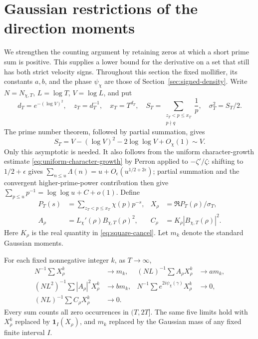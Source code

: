 \section{Gaussian restrictions of the direction moments}
\label{sec:gaussian-moments}
We strengthen the counting argument by retaining zeros at which a short
prime sum is positive. This supplies a lower bound for the derivative
on a set that still has both strict velocity signs. Throughout this
section the fixed mollifier, its constants $a,b$, and the phase
$\psi_\chi$ are those of Section~\ref{sec:signed-density}. Write
$N=N_{\chi,T}$, $L=\log T$, $V=\log L$, and put
\[
 d_T=e^{-(\log V)^2},\quad z_T=d_T^{-1},\quad x_T=T^{d_T},\quad
 S_T=\sum_{\substack{z_T<p\le x_T\\p\nmid q}}\frac1p,
 \quad \sigma_T^2=S_T/2.
\]
The prime number theorem, followed by partial summation, gives
\[
 S_T=V-(\log V)^2-2\log\log V+O_\chi(1)\sim V.
\]
Only this asymptotic is needed. It also follows from the uniform
character-growth estimate \eqref{eq:uniform-character-growth} by Perron
applied to $-\zeta'/\zeta$: shifting to $1/2+\epsilon$ gives
$\sum_{n\le u}\Lambda(n)=u+O_\epsilon(u^{1/2+2\epsilon})$;
partial summation and the convergent higher-prime-power contribution
then give $\sum_{p\le u}p^{-1}=\log\log u+C+o(1)$.
Define
\begin{align*}
 P_T(s)&=\sum_{z_T<p\le x_T}\chi(p)p^{-s},&
 X_\rho&=\Re P_T(\rho)/\sigma_T,\\
 A_\rho&=L_\chi'(\rho)B_{\chi,T}(\rho)^2,&
 C_\rho&=K_\rho|B_{\chi,T}(\rho)|^2.
\end{align*}
Here $K_\rho$ is the real quantity in \eqref{eq:square-cancel}.
Let $m_k$ denote the standard Gaussian moments.

\begin{theorem}\label{thm:gaussian-direction-moments}
For each fixed nonnegative integer $k$, as $T\to\infty$,
\begin{align*}
 N^{-1}\sum X_\rho^k&\longrightarrow m_k,&
 (NL)^{-1}\sum A_\rho X_\rho^k&\longrightarrow a m_k,\\
 (NL^2)^{-1}\sum|A_\rho|^2X_\rho^k&\longrightarrow b m_k,&
 N^{-1}\sum e^{2i\psi_\chi(\gamma)}X_\rho^k&\longrightarrow0,\\
 (NL)^{-1}\sum C_\rho X_\rho^k&\longrightarrow0.
\end{align*}
Every sum counts all zero occurrences in $(T,2T]$. The same five
limits hold with $X_\rho^k$ replaced by $\mathbf1_I(X_\rho)$,
and $m_k$ replaced by the Gaussian mass of any fixed finite interval $I$.
\end{theorem}

